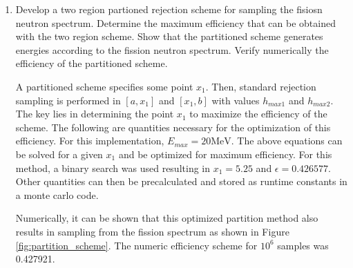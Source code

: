 \documentclass{article}
\begin{document}
\begin{enumerate}
\begin{enumerate}
      \item Develop a two region partioned rejection scheme for sampling the
        fisiosn neutron spectrum. Determine the maximum efficiency that can be
        obtained with the two region scheme. Show that the partitioned scheme
        generates energies according to the fission neutron spectrum. Verify
        numerically the efficiency of the partitioned scheme.

        A partitioned scheme specifies some point $x_1$. Then, standard
        rejection sampling is performed in $[a,x_1]$ and $[x_1,b]$ with values
        $h_{max1}$ and $h_{max2}$. The key lies in determining the point $x_1$
        to maximize the efficiency of the scheme. The following are quantities
        necessary for the optimization of this efficiency. For this
        implementation, $E_{max} = 20 \text{MeV}$. 
        The above equations can be solved for a given $x_1$ and be optimized for
        maximum efficiency. For this method, a binary search was used resulting
        in $x_1 = 5.25$ and $\epsilon = 0.426577$. Other quantities can then be
        precalculated and stored as runtime constants in a monte carlo code. 

        Numerically, it can be shown that this optimized partition method also
        results in sampling from the fission spectrum as shown in Figure
        \ref{fig:partition_scheme}. The numeric efficiency scheme for $10^6$
        samples was 0.427921.


\end{enumerate}
\end{enumerate}
\end{document}
